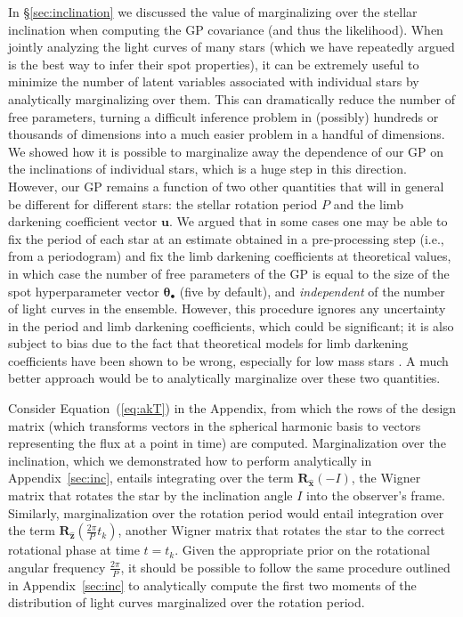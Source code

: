 \documentclass[modern]{aastex62}
\begin{document}
In \S\ref{sec:inclination} we discussed the value of marginalizing over the
stellar inclination when computing the GP covariance (and thus the likelihood).
When jointly analyzing the light curves of many stars (which we have repeatedly
argued is the best way to infer their spot properties), it can be extremely useful to
minimize the number of latent variables associated with individual stars by
analytically marginalizing over them. This can dramatically reduce the number
of free parameters, turning a difficult inference problem in (possibly) hundreds
or thousands of dimensions into a much easier problem in a handful of dimensions.
We showed how it is possible to marginalize away the dependence of our GP on
the inclinations of individual stars, which is a huge step in this direction.
However, our GP remains a function of two other quantities that will in general
be different for different stars: the stellar rotation period $P$ and the
limb darkening coefficient vector $\mathbf{u}$. We argued that in some cases
one may be able to fix the period of each star at an estimate obtained in a pre-processing
step (i.e., from a periodogram) and fix the limb darkening coefficients at
theoretical values, in which case the number of free parameters of the GP
is equal to the size of the spot hyperparameter vector $\pmb{\theta}_\bullet$
(five by default), and \emph{independent} of the number of light curves in
the ensemble.
%
However, this procedure ignores any uncertainty in the period and limb darkening
coefficients, which could be significant; it is also subject to bias due to
the fact that theoretical models for limb darkening coefficients have been
shown to be wrong, especially for low mass stars \citep{?}. A much better
approach would be to analytically marginalize over these two quantities.

Consider Equation~(\ref{eq:akT}) in the Appendix, from which the rows of the
design matrix (which transforms vectors in the spherical harmonic basis to vectors
representing the flux at a point in time) are computed. Marginalization over the
inclination, which we demonstrated how to perform analytically in
Appendix~\ref{sec:inc}, entails integrating over the term
$\mathbf{R}_{\hat{\mathbf{x}}}\left(-I\right)$, the Wigner matrix that rotates
the star by the inclination angle $I$ into the observer's frame.
Similarly, marginalization over the
rotation period would entail integration over the term
$\mathbf{R}_{\hat{\mathbf{z}}}\left(\frac{2\pi}{P} t_k\right)$, another
Wigner matrix that rotates the star to the correct rotational phase at
time $t = t_k$. Given the appropriate prior on the rotational angular
frequency $\frac{2\pi}{P}$, it should be possible to follow the same
procedure outlined in Appendix~\ref{sec:inc} to analytically
compute the first two moments of the distribution of light curves marginalized over the
rotation period.
\end{document}
